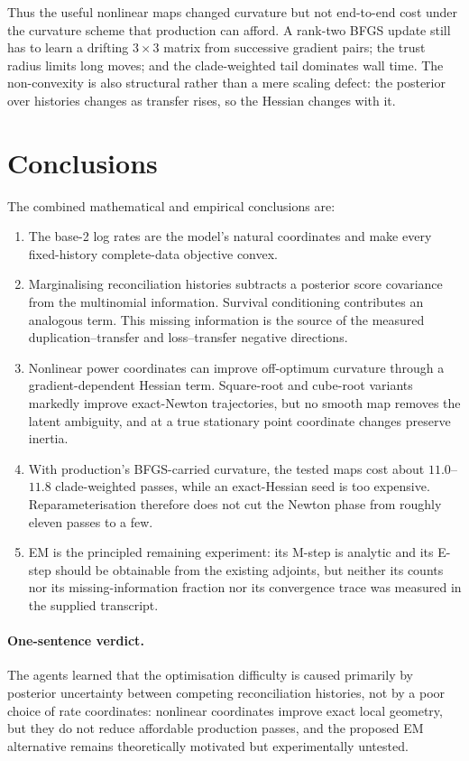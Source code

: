 \documentclass[11pt]{article}
\begin{document}
Thus the useful nonlinear maps changed curvature but not end-to-end cost under the curvature scheme
that production can afford.  A rank-two BFGS update still has to learn a drifting $3\times3$
matrix from successive gradient pairs; the trust radius limits long moves; and the clade-weighted
tail dominates wall time.  The non-convexity is also structural rather than a mere scaling defect:
the posterior over histories changes as transfer rises, so the Hessian changes with it.

\section{Conclusions}

The combined mathematical and empirical conclusions are:
\begin{enumerate}
  \item The base-2 log rates are the model's natural coordinates and make every fixed-history
        complete-data objective convex.
  \item Marginalising reconciliation histories subtracts a posterior score covariance from the
        multinomial information.  Survival conditioning contributes an analogous term.  This
        missing information is the source of the measured duplication--transfer and
        loss--transfer negative directions.
  \item Nonlinear power coordinates can improve off-optimum curvature through a
        gradient-dependent Hessian term.  Square-root and cube-root variants markedly improve
        exact-Newton trajectories, but no smooth map removes the latent ambiguity, and at a true
        stationary point coordinate changes preserve inertia.
  \item With production's BFGS-carried curvature, the tested maps cost about
        $11.0$--$11.8$ clade-weighted passes, while an exact-Hessian seed is too expensive.
        Reparameterisation therefore does not cut the Newton phase from roughly eleven passes to a
        few.
  \item EM is the principled remaining experiment: its M-step is analytic and its E-step should be
        obtainable from the existing adjoints, but neither its counts nor its missing-information
        fraction nor its convergence trace was measured in the supplied transcript.
\end{enumerate}

\paragraph{One-sentence verdict.}
The agents learned that the optimisation difficulty is caused primarily by posterior uncertainty
between competing reconciliation histories, not by a poor choice of rate coordinates: nonlinear
coordinates improve exact local geometry, but they do not reduce affordable production passes,
and the proposed EM alternative remains theoretically motivated but experimentally untested.
\end{document}
